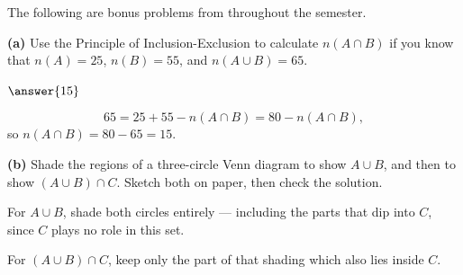\documentclass[12pt]{ximera}
\begin{document}
\begin{problem}
The following are bonus problems from throughout the semester.

\begin{prompt}
\textbf{(a)} Use the Principle of Inclusion-Exclusion to calculate $n(A\cap B)$ if
you know that $n(A)=25$, $n(B)=55$, and $n(A\cup B)=65$.

$\answer{15}$

\begin{feedback}
\[ 65 = 25 + 55 - n(A\cap B) = 80 - n(A\cap B), \]
so $n(A\cap B)=80-65=15$.
\end{feedback}
\end{prompt}

\begin{prompt}
\textbf{(b)} Shade the regions of a three-circle Venn diagram to show $A\cup B$, and
then to show $(A\cup B)\cap C$. Sketch both on paper, then check the solution.

\begin{freeResponse}
\end{freeResponse}

\begin{feedback}
For $A\cup B$, shade both circles entirely --- including the parts that dip into $C$,
since $C$ plays no role in this set.

For $(A\cup B)\cap C$, keep only the part of that shading which also lies inside $C$.
\begin{center}
\qquad
{}
\end{center}
\end{feedback}
\end{prompt}


\end{problem}
\end{document}
